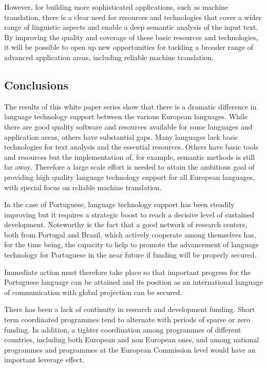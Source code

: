 \begin{multicols}{2}
However, for building more sophisticated applications, such as machine translation, there is a clear need for resources and technologies that cover a wider range of linguistic aspects and enable a deep semantic analysis of the input text. By improving the quality and coverage of these basic resources and technologies, it will be possible to open up new opportunities for tackling a broader range of advanced application areas, including reliable machine translation.

\subsection{Conclusions}

The results of this white paper series show that there is a dramatic difference in language technology support between the various European languages. While there are good quality software and resources available for some languages and application areas, others have substantial gaps. Many languages lack basic technologies for text analysis and the essential resources. Others have basic tools and resources but the implementation of, for example, semantic methods is still far away. Therefore a large scale effort is needed to attain the ambitious goal of providing high quality language technology support for all European languages, with special focus on reliable machine translation. 

 In the case of Portuguese, language technology support has been steadily improving but it requires a strategic boost to reach a decisive level of sustained development. 
Noteworthy is the fact that a good network of research centers, both from Portugal and Brazil, which actively cooperate among themselves has, for the time being, 
the capacity to help to promote the advancement of language technology for Portuguese in the near future if funding will be properly secured.

Immediate action must therefore take place so that important progress for the Portuguese language can be attained
and its position as an international language of communication with global projection can be secured.


There has been a lack of continuity in research and development funding. 
Short term coordinated programmes tend to alternate with periods of sparse or zero funding. 
In addition, a tighter coordination among programmes of different countries, including
both European and non European ones, and among national programmes and programmes at the European Commission level
would have an important leverage effect.


\end{multicols}

